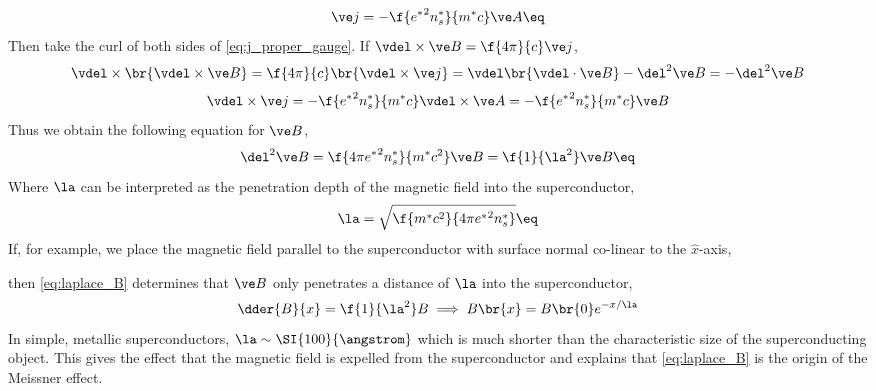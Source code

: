 \documentclass{article}
\begin{document}
\[ \ve j = - \f{{e^*}^2n_s^*}{m^* c} \ve A \eq \label{eq:j_proper_gauge}\]
Then take the curl of both sides of \cref{eq:j_proper_gauge}. If $\vdel \times \ve B = \f{4\pi}{c}\ve j$,
\[ \vdel \times \br{\vdel \times \ve B} = \f{4\pi}{c}\br{\vdel \times \ve j} = \vdel \br{\vdel \cdot \ve B} - \del^2 \ve B = - \del^2 \ve B \]
\[ \vdel \times \ve j = -\f{{e^*}^2n_s^*}{m^* c}\vdel \times \ve A =  -\f{{e^*}^2n_s^*}{m^* c}\ve B\]
Thus we obtain the following equation for $\ve B$,
\[ \del^2 \ve B = \f{4\pi{e^*}^2n_s^*}{m^*c^2} \ve B = \f{1}{\la^2}\ve B \eq \label{eq:laplace_B}\]
Where $\la$ can be interpreted as the penetration depth of the magnetic field into the superconductor,
\[ \la = \sqrt{\f{m^* c^2}{4 \pi {e^*}^2 n_s^*}} \eq \label{eq:penetration_depth}\]
If, for example, we place the magnetic field parallel to the superconductor with surface normal co-linear to the $\hat x$-axis,
\begin{center}
\end{center}
then \cref{eq:laplace_B} determines that $\ve B$ only penetrates a distance of $\la$ into the superconductor,
\[ \dder{B}{x} = \f{1}{\la^2}B \implies B\br{x} = B\br{0}e^{-x/\la} \]
In simple, metallic superconductors, $\la \sim \SI{100}{\angstrom}$ which is much shorter than the characteristic size of the superconducting object. This gives the effect that the magnetic field is expelled from the superconductor and explains that \cref{eq:laplace_B} is the origin of the Meissner effect. \\
\end{document}
